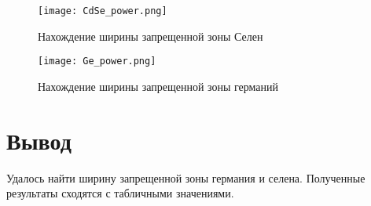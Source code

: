 \documentclass[a4paper, 14pt]{article}
\begin{document}
\begin{figure}[htbp]
    \centering
    \texttt{[image: CdSe\_power.png]}


    \caption{Нахождение ширины запрещенной зоны Селен}
    \label{fig:pow1}
\end{figure}

\begin{figure}[htbp]
    \centering
    \texttt{[image: Ge\_power.png]}
    

    \caption{Нахождение ширины запрещенной зоны германий}
    \label{fig:pow2}
\end{figure}

\newpage
\section*{\textcolor{header}{Вывод}}

Удалось найти ширину запрещенной зоны германия и селена. Полученные результаты сходятся с табличными значениями.
\end{document}

